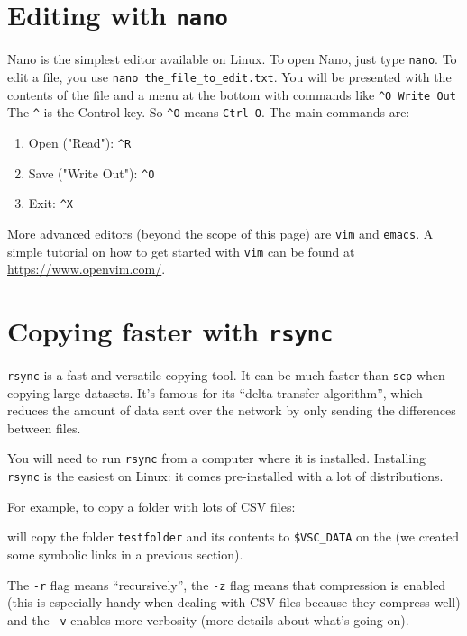 \section{Editing with \texttt{nano}}

Nano is the simplest editor available on Linux. To open Nano, just type
\verb|nano|. To edit a file, you use \verb|nano the_file_to_edit.txt|. You will
be presented with the contents of the file and a menu at the bottom with
commands like \verb|^O Write Out| The \verb|^| is the Control key. So \verb|^O| means
\verb|Ctrl-O|. The main commands are:

\begin{enumerate}
\item Open ("Read"): \verb|^R|
\item Save ("Write Out"): \verb|^O|
\item Exit: \verb|^X|
\end{enumerate}

More advanced editors (beyond the scope of this page) are \verb|vim| and \verb|emacs|.
A simple tutorial on how to get started with \verb|vim| can be found at \url{https://www.openvim.com/}.

\section{Copying faster with \texttt{rsync}}
\hypertarget{sec:rsync}{}

\verb|rsync| is a fast and versatile copying tool. It can be much faster than \verb|scp|
when copying large datasets. It's famous for its ``delta-transfer algorithm'', which
reduces the amount of data sent over the network by only sending the differences between
files.

You will need to run \verb|rsync| from a computer where it is installed. Installing
\verb|rsync| is the easiest on Linux: it comes pre-installed with a lot of distributions.

For example, to copy a folder with lots of CSV files:

\begin{prompt}
\end{prompt}

will copy the folder \verb|testfolder| and its contents to \verb|$VSC_DATA| on
the \hpc (we created some symbolic links in a previous section).

The \verb|-r| flag means ``recursively'', the \verb|-z| flag means that compression
is enabled (this is especially handy when dealing with CSV files because they compress well) and the \verb|-v|
enables more verbosity (more details about what's going on).

